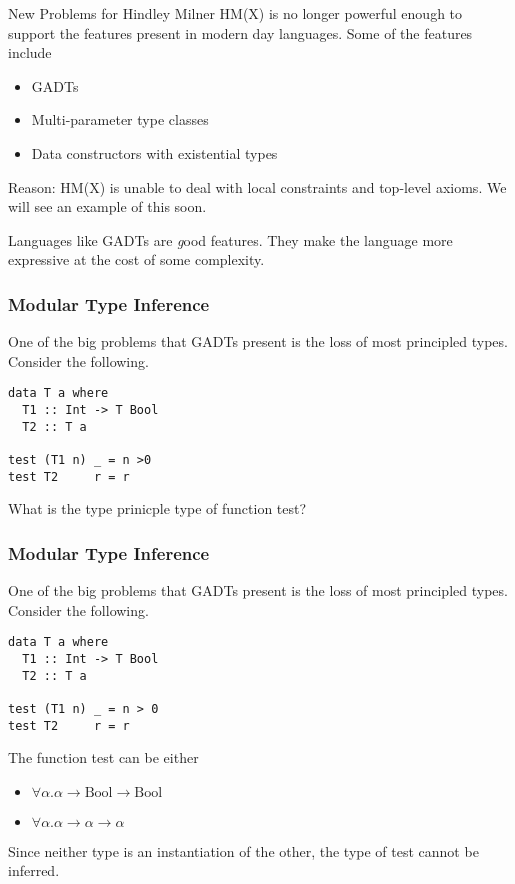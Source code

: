 \documentclass{beamer}
\subtitle{D. Vytiniotis, S. P. Jones, T. Schrijvers, M. Sulzmann}
\author{Jasson Casey \& Michael Lopez}
\date{April 26, 2012}
\begin{document}
\begin{frame}
\titlepage
\end{frame}

\begin{frame}{New Problems for Hindley Milner}
HM(X) is no longer powerful enough to support the features present in modern day languages. Some of the features include
\begin{itemize}
\item GADTs
\item Multi-parameter type classes
\item Data constructors with existential types
\end{itemize}
Reason: HM(X) is unable to deal with local constraints and top-level axioms. We will see an example of this soon.

Languages like GADTs are {\emph good} features. They make the language more expressive at the cost of some complexity.
\end{frame}

\begin{frame}[fragile]
\frametitle{Modular Type Inference}
One of the big problems that GADTs present is the loss of most principled types. Consider the following.
\begin{lstlisting}
data T a where
  T1 :: Int -> T Bool
  T2 :: T a

test (T1 n) _ = n >0
test T2     r = r
\end{lstlisting}
What is the type prinicple type of function test?
\end{frame}

\begin{frame}[fragile]
\frametitle{Modular Type Inference}
One of the big problems that GADTs present is the loss of most principled types. Consider the following.
\begin{lstlisting}
data T a where
  T1 :: Int -> T Bool
  T2 :: T a

test (T1 n) _ = n > 0
test T2     r = r
\end{lstlisting}
The function test can be either
\begin{itemize}
\item $\forall \alpha.\alpha \rightarrow \mbox{Bool} \rightarrow \mbox{Bool}$
\item $\forall \alpha.\alpha \rightarrow \alpha \rightarrow \alpha$
\end{itemize}
Since neither type is an instantiation of the other, the type of test cannot be inferred.
\end{frame}
\end{document}
